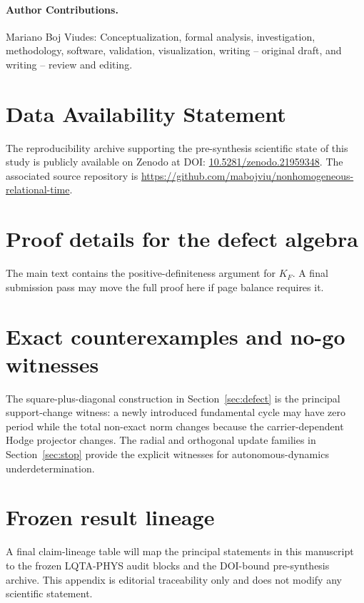 \documentclass[aip,jmp,amsmath,amssymb,reprint]{revtex4-2}
\begin{document}
\paragraph*{Author Contributions.}
Mariano Boj Viudes: Conceptualization, formal analysis, investigation, methodology, software, validation, visualization, writing -- original draft, and writing -- review and editing.

\section*{Data Availability Statement}
The reproducibility archive supporting the pre-synthesis scientific state of this study is publicly available on Zenodo at DOI: \href{https://doi.org/10.5281/zenodo.21959348}{10.5281/zenodo.21959348}. The associated source repository is \url{https://github.com/mabojviu/nonhomogeneous-relational-time}.

\appendix

\section{Proof details for the defect algebra}\label{app:defect}
The main text contains the positive-definiteness argument for $K_F$. A final submission pass may move the full proof here if page balance requires it.

\section{Exact counterexamples and no-go witnesses}\label{app:witnesses}
The square-plus-diagonal construction in Section~\ref{sec:defect} is the principal support-change witness: a newly introduced fundamental cycle may have zero period while the total non-exact norm changes because the carrier-dependent Hodge projector changes. The radial and orthogonal update families in Section~\ref{sec:stop} provide the explicit witnesses for autonomous-dynamics underdetermination.

\section{Frozen result lineage}\label{app:lineage}
A final claim-lineage table will map the principal statements in this manuscript to the frozen LQTA-PHYS audit blocks and the DOI-bound pre-synthesis archive. This appendix is editorial traceability only and does not modify any scientific statement.
\end{document}
